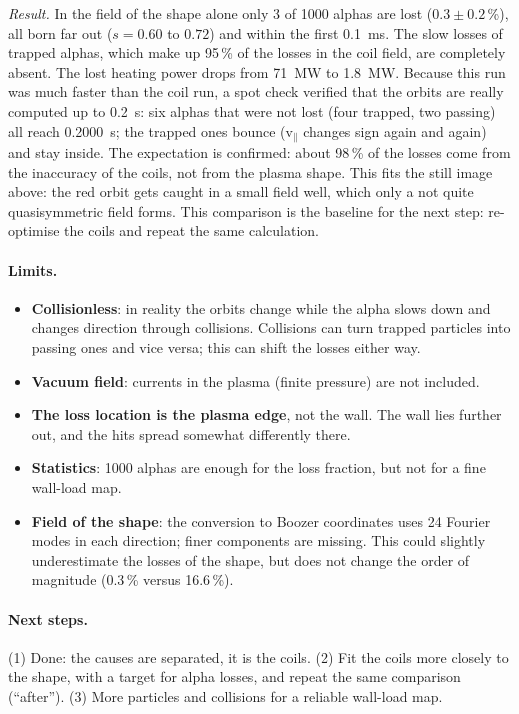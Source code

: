 \emph{Result.} In the field of the shape alone only 3 of 1000 alphas are lost ($0.3 \pm 0.2$\,\%), all born far out
($s = 0.60$ to $0.72$) and within the first \SI{0.1}{ms}. The slow losses of trapped alphas, which make up 95\,\% of
the losses in the coil field, are completely absent. The lost heating power drops from \SI{71}{MW} to \SI{1.8}{MW}.
Because this run was much faster than the coil run, a spot check verified that the orbits are really computed up
to \SI{0.2}{s}: six alphas that were not lost (four trapped, two passing) all reach \SI{0.2000}{s}; the trapped ones
bounce (v$_\parallel$ changes sign again and again) and stay inside.
The expectation is confirmed: about 98\,\% of the losses come from the inaccuracy of the coils, not from the plasma
shape. This fits the still image above: the red orbit gets caught in a small field well, which only a not quite
quasisymmetric field forms. This comparison is the baseline for the next step: re-optimise the coils and repeat the
same calculation.

\paragraph{Limits.}
\begin{itemize}\itemsep1pt
\item \textbf{Collisionless}: in reality the orbits change while the alpha slows down and changes direction through
  collisions. Collisions can turn trapped particles into passing ones and vice versa; this can shift the losses either
  way.
\item \textbf{Vacuum field}: currents in the plasma (finite pressure) are not included.
\item \textbf{The loss location is the plasma edge}, not the wall. The wall lies further out, and the hits spread
  somewhat differently there.
\item \textbf{Statistics}: 1000 alphas are enough for the loss fraction, but not for a fine wall-load map.
\item \textbf{Field of the shape}: the conversion to Boozer coordinates uses 24 Fourier modes in each direction; finer
  components are missing. This could slightly underestimate the losses of the shape, but does not change the order of
  magnitude (0.3\,\% versus 16.6\,\%).
\end{itemize}

\paragraph{Next steps.} (1) Done: the causes are separated, it is the coils. (2) Fit the coils more closely to the
shape, with a target for alpha losses, and repeat the same comparison (``after''). (3) More particles and collisions
for a reliable wall-load map.
